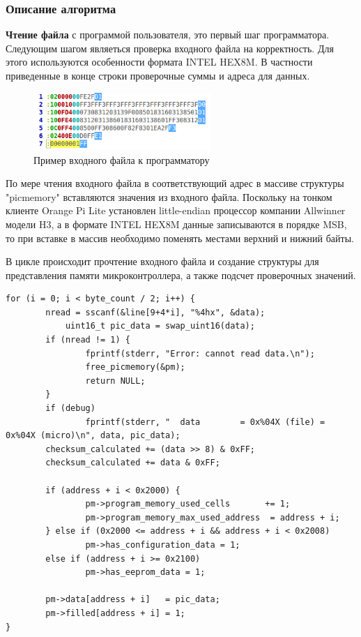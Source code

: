 \subsubsection{Описание алгоритма}

\textbf{Чтение файла} с программой пользователя, это первый шаг программатора. Следующим шагом 
являеться проверка входного файла на корректность. Для этого используются особенности формата INTEL HEX8M.
В частности приведенные в конце строки проверочные суммы и адреса для данных.

\begin{figure}[h!]
    \centering
    \includegraphics[width=0.6\textwidth]{negated_intel_hex_colored_file_example.png}
    \caption{Пример входного файла к программатору}
\end{figure}


По мере чтения входного файла в соответствующий адрес в массиве структуры "picmemory" вставляются значения из входного файла. 
Поскольку на тонком клиенте Orange Pi Lite установлен little-endian процессор 
компании Allwinner модели H3, а в формате INTEL HEX8M данные записываются в порядке 
MSB, то при вставке в массив необходимо поменять местами верхний и нижний байты.

В цикле происходит прочтение входного файла и создание структуры для представления памяти микроконтроллера, а также подсчет проверочных значений.
\begin{small}
\begin{verbatim}
for (i = 0; i < byte_count / 2; i++) {
        nread = sscanf(&line[9+4*i], "%4hx", &data);
	        uint16_t pic_data = swap_uint16(data);
        if (nread != 1) {
                fprintf(stderr, "Error: cannot read data.\n");
                free_picmemory(&pm);
                return NULL;
        }
        if (debug)
                fprintf(stderr, "  data        = 0x%04X (file) = 0x%04X (micro)\n", data, pic_data);
        checksum_calculated += (data >> 8) & 0xFF;
        checksum_calculated += data & 0xFF;

        if (address + i < 0x2000) {
                pm->program_memory_used_cells       += 1;
                pm->program_memory_max_used_address  = address + i;
        } else if (0x2000 <= address + i && address + i < 0x2008)
                pm->has_configuration_data = 1;
        else if (address + i >= 0x2100)
                pm->has_eeprom_data = 1;

        pm->data[address + i]   = pic_data;
        pm->filled[address + i] = 1;
}
\end{verbatim}
\end{small}

